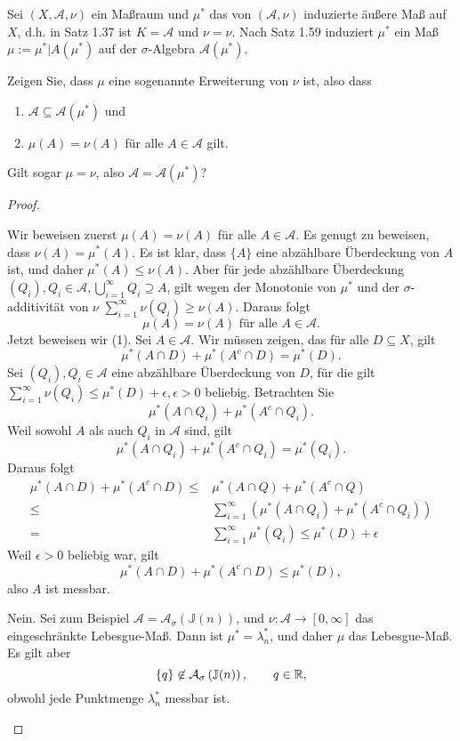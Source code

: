 \begin{Problem}
	 Sei $(X, \mathcal{A}, \nu)$ ein Maßraum und $\mu^*$ das von $(\mathcal{A}, \nu)$ induzierte äußere Maß auf $X$, d.h. in Satz 1.37 ist $K = \mathcal{A}$ und $\nu=\nu$. Nach Satz 1.59 induziert $\mu^*$ ein Maß $\mu := \mu^* |A(\mu^*)$ auf der $\sigma$-Algebra $\mathcal{A}(\mu^*)$.
	 \begin{parts}
	 \item Zeigen Sie, dass $\mu$ eine sogenannte Erweiterung von $\nu$ ist, also dass
		 \begin{enumerate}[label=(\arabic*)]
			 \item $\mathcal{A}\subseteq \mathcal{A}(\mu^*)$ und
			 \item $\mu(A)=\nu(A)$ f\"{u}r alle $A\in \mathcal{A}$ gilt.
		 \end{enumerate}
	 \item Gilt sogar $\mu=\nu$, also $\mathcal{A}=\mathcal{A}(\mu^*)$?
	 \end{parts}
\end{Problem}
\begin{proof}
	\begin{parts}
	\item Wir beweisen zuerst $\mu(A)=\nu(A)$ f\"{u}r alle $A\in \mathcal{A}$. Es genugt zu beweisen, dass $\nu(A)=\mu^*(A)$. Es ist klar, dass $\{A\}$ eine abzählbare Überdeckung von $A$ ist, und daher $\mu^*(A)\le \nu(A)$. Aber f\"{u}r jede abzählbare Überdeckung $(Q_i),Q_i\in \mathcal{A},\bigcup_{i=1}^\infty Q_i\supseteq A $, gilt wegen der Monotonie von $\mu^*$ und der $\sigma$-additivität von $\nu$ $\sum_{i=1}^{\infty} \nu(Q_i)\ge \nu(A)$. Daraus folgt
		\[
			\mu(A)=\nu(A)\text{ f\"{u}r alle }A\in \mathcal{A}
		.\] 
		Jetzt beweisen wir (1). Sei $A\in \mathcal{A}$. Wir müssen zeigen, das f\"{u}r alle $D\subseteq X$, gilt
		\[
			\mu^*(A\cap D)+\mu^*(A^c\cap D)=\mu^*(D)
		.\] 
		Sei $(Q_i),Q_i\in\mathcal{A}$ eine abzählbare Überdeckung von $D$, f\"{u}r die gilt $\sum_{i=1}^{\infty} \nu(Q_i)\le \mu^*(D)+\epsilon, \epsilon>0$ beliebig.  Betrachten Sie
		\[
			\mu^*(A\cap Q_i)+\mu^*(A^c\cap Q_i)
		.\] 
		Weil sowohl $A$ als auch  $Q_i$ in $\mathcal{A}$ sind, gilt
		\[
			\mu^*(A\cap Q_i)+\mu^*(A^c\cap Q_i)=\mu^*(Q_i)
		.\] 
		Daraus folgt
	\begin{align*}
		\mu^*(A\cap D)+\mu^*(A^c\cap D)\le& \mu^*(A\cap Q)+\mu^*(A^c\cap Q)\\
		\le& \sum_{i=1}^{\infty} \left( \mu^*(A\cap Q_i)+\mu^*(A^c\cap Q_i) \right)\\
		=&\sum_{i=1}^{\infty} \mu^*(Q_i)\le\mu^*(D)+\epsilon
		\end{align*}
		Weil $\epsilon>0$ beliebig war, gilt
		\[
		\mu^*(A\cap D)+\mu^*(A^c\cap D)\le \mu^*(D)
		,\] 
		also $A$ ist messbar.
	\item Nein. Sei zum Beispiel $\mathcal{A}=\mathcal{A}_\sigma\left(\mathbb{J}(n)\right)$, und $\nu:\mathcal{A}\to [0,\infty]$ das eingeschränkte Lebesgue-Maß. Dann ist $\mu^*=\lambda_n^*$, und daher $\mu$ das Lebesgue-Maß. Es gilt aber
		\[
			\left\{ q \right\} \not\in \mathcal{A}_\sigma\left( \mathbb{J}(n) \right), \qquad q\in \mathbb{R}
		,\] 
		obwohl jede Punktmenge $\lambda_n^*$ messbar ist.\qedhere
	\end{parts}
\end{proof}
